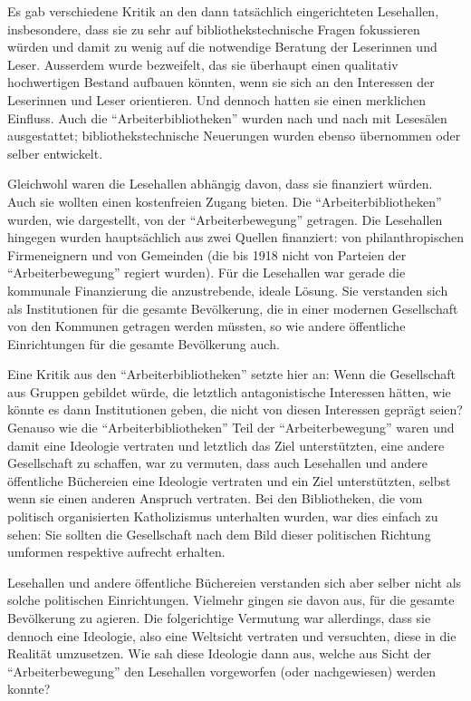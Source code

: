 \documentclass[a4paper,
fontsize=11pt,
oneside,
numbers=noperiodatend,
parskip=half-,
bibliography=totoc,
final
]{scrartcl}
\begin{document}
Es gab verschiedene Kritik an den dann tatsächlich eingerichteten
Lesehallen, insbesondere, dass sie zu sehr auf bibliothekstechnische
Fragen fokussieren würden und damit zu wenig auf die notwendige Beratung
der Leserinnen und Leser. Ausserdem wurde bezweifelt, das sie überhaupt
einen qualitativ hochwertigen Bestand aufbauen könnten, wenn sie sich an
den Interessen der Leserinnen und Leser orientieren. Und dennoch hatten
sie einen merklichen Einfluss. Auch die \enquote{Arbeiterbibliotheken}
wurden nach und nach mit Lesesälen ausgestattet; bibliothekstechnische
Neuerungen wurden ebenso übernommen oder selber entwickelt.

Gleichwohl waren die Lesehallen abhängig davon, dass sie finanziert
würden. Auch sie wollten einen kostenfreien Zugang bieten. Die
\enquote{Arbeiterbibliotheken} wurden, wie dargestellt, von der
\enquote{Arbeiterbewegung} getragen. Die Lesehallen hingegen wurden
hauptsächlich aus zwei Quellen finanziert: von philanthropischen
Firmeneignern und von Gemeinden (die bis 1918 nicht von Parteien der
\enquote{Arbeiterbewegung} regiert wurden). Für die Lesehallen war
gerade die kommunale Finanzierung die anzustrebende, ideale Lösung. Sie
verstanden sich als Institutionen für die gesamte Bevölkerung, die in
einer modernen Gesellschaft von den Kommunen getragen werden müssten, so
wie andere öffentliche Einrichtungen für die gesamte Bevölkerung auch.

Eine Kritik aus den \enquote{Arbeiterbibliotheken} setzte hier an: Wenn
die Gesellschaft aus Gruppen gebildet würde, die letztlich
antagonistische Interessen hätten, wie könnte es dann Institutionen
geben, die nicht von diesen Interessen geprägt seien? Genauso wie die
\enquote{Arbeiterbibliotheken} Teil der \enquote{Arbeiterbewegung} waren
und damit eine Ideologie vertraten und letztlich das Ziel unterstützten,
eine andere Gesellschaft zu schaffen, war zu vermuten, dass auch
Lesehallen und andere öffentliche Büchereien eine Ideologie vertraten
und ein Ziel unterstützten, selbst wenn sie einen anderen Anspruch
vertraten. Bei den Bibliotheken, die vom politisch organisierten
Katholizismus unterhalten wurden, war dies einfach zu sehen: Sie sollten
die Gesellschaft nach dem Bild dieser politischen Richtung umformen
respektive aufrecht erhalten.

Lesehallen und andere öffentliche Büchereien verstanden sich aber selber
nicht als solche politischen Einrichtungen. Vielmehr gingen sie davon
aus, für die gesamte Bevölkerung zu agieren. Die folgerichtige Vermutung
war allerdings, dass sie dennoch eine Ideologie, also eine Weltsicht
vertraten und versuchten, diese in die Realität umzusetzen. Wie sah
diese Ideologie dann aus, welche aus Sicht der
\enquote{Arbeiterbewegung} den Lesehallen vorgeworfen (oder
nachgewiesen) werden konnte?
\end{document}

